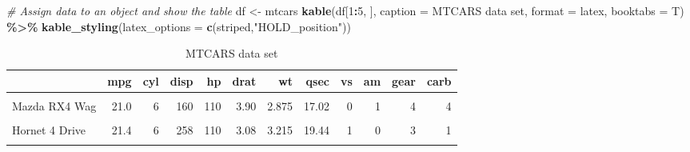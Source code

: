 \documentclass[
  5pt,
]{article}
\newenvironment{Shaded}{\begin{snugshade}}{\end{snugshade}}
\newcommand{\AttributeTok}[1]{\textcolor[rgb]{0.13,0.29,0.53}{#1}}
\newcommand{\CommentTok}[1]{\textcolor[rgb]{0.56,0.35,0.01}{\textit{#1}}}
\newcommand{\DecValTok}[1]{\textcolor[rgb]{0.00,0.00,0.81}{#1}}
\newcommand{\FunctionTok}[1]{\textcolor[rgb]{0.13,0.29,0.53}{\textbf{#1}}}
\newcommand{\NormalTok}[1]{#1}
\newcommand{\OtherTok}[1]{\textcolor[rgb]{0.56,0.35,0.01}{#1}}
\newcommand{\SpecialCharTok}[1]{\textcolor[rgb]{0.81,0.36,0.00}{\textbf{#1}}}
\newcommand{\StringTok}[1]{\textcolor[rgb]{0.31,0.60,0.02}{#1}}
\begin{document}
\begin{Shaded}
\begin{Highlighting}[]
\CommentTok{\# Assign data to an object and show the table }
\NormalTok{df }\OtherTok{\textless{}{-}}\NormalTok{ mtcars}
\FunctionTok{kable}\NormalTok{(df[}\DecValTok{1}\SpecialCharTok{:}\DecValTok{5}\NormalTok{, ], }\AttributeTok{caption =} \StringTok{\textquotesingle{}MTCARS data set\textquotesingle{}}\NormalTok{, }\AttributeTok{format =} \StringTok{\textquotesingle{}latex\textquotesingle{}}\NormalTok{, }\AttributeTok{booktabs =}\NormalTok{ T) }\SpecialCharTok{\%\textgreater{}\%}
            \FunctionTok{kable\_styling}\NormalTok{(}\AttributeTok{latex\_options =} \FunctionTok{c}\NormalTok{(}\StringTok{\textquotesingle{}striped\textquotesingle{}}\NormalTok{,}\StringTok{"HOLD\_position"}\NormalTok{))}
\end{Highlighting}
\end{Shaded}

\begin{table}[H]
\centering
\caption{\label{tab:unnamed-chunk-1}MTCARS data set}
\centering
\begin{tabular}[t]{lrrrrrrrrrrr}
\toprule
  & mpg & cyl & disp & hp & drat & wt & qsec & vs & am & gear & carb\\
\midrule
\cellcolor{gray!10}{Mazda RX4} & \cellcolor{gray!10}{21.0} & \cellcolor{gray!10}{6} & \cellcolor{gray!10}{160} & \cellcolor{gray!10}{110} & \cellcolor{gray!10}{3.90} & \cellcolor{gray!10}{2.620} & \cellcolor{gray!10}{16.46} & \cellcolor{gray!10}{0} & \cellcolor{gray!10}{1} & \cellcolor{gray!10}{4} & \cellcolor{gray!10}{4}\\
Mazda RX4 Wag & 21.0 & 6 & 160 & 110 & 3.90 & 2.875 & 17.02 & 0 & 1 & 4 & 4\\
\cellcolor{gray!10}{Datsun 710} & \cellcolor{gray!10}{22.8} & \cellcolor{gray!10}{4} & \cellcolor{gray!10}{108} & \cellcolor{gray!10}{93} & \cellcolor{gray!10}{3.85} & \cellcolor{gray!10}{2.320} & \cellcolor{gray!10}{18.61} & \cellcolor{gray!10}{1} & \cellcolor{gray!10}{1} & \cellcolor{gray!10}{4} & \cellcolor{gray!10}{1}\\
Hornet 4 Drive & 21.4 & 6 & 258 & 110 & 3.08 & 3.215 & 19.44 & 1 & 0 & 3 & 1\\
\cellcolor{gray!10}{Hornet Sportabout} & \cellcolor{gray!10}{18.7} & \cellcolor{gray!10}{8} & \cellcolor{gray!10}{360} & \cellcolor{gray!10}{175} & \cellcolor{gray!10}{3.15} & \cellcolor{gray!10}{3.440} & \cellcolor{gray!10}{17.02} & \cellcolor{gray!10}{0} & \cellcolor{gray!10}{0} & \cellcolor{gray!10}{3} & \cellcolor{gray!10}{2}\\
\bottomrule
\end{tabular}
\end{table}
\end{document}
